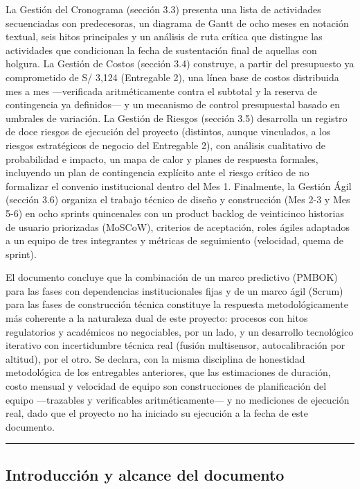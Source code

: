 \documentclass[11pt,a4paper]{article}
\begin{document}
La Gestión del Cronograma (sección 3.3) presenta una lista de actividades secuenciadas con predecesoras, un diagrama de Gantt de ocho meses en notación textual, seis hitos principales y un análisis de ruta crítica que distingue las actividades que condicionan la fecha de sustentación final de aquellas con holgura. La Gestión de Costos (sección 3.4) construye, a partir del presupuesto ya comprometido de S/ 3,124 (Entregable 2), una línea base de costos distribuida mes a mes ---verificada aritméticamente contra el subtotal y la reserva de contingencia ya definidos--- y un mecanismo de control presupuestal basado en umbrales de variación. La Gestión de Riesgos (sección 3.5) desarrolla un registro de doce riesgos de ejecución del proyecto (distintos, aunque vinculados, a los riesgos estratégicos de negocio del Entregable 2), con análisis cualitativo de probabilidad e impacto, un mapa de calor y planes de respuesta formales, incluyendo un plan de contingencia explícito ante el riesgo crítico de no formalizar el convenio institucional dentro del Mes 1. Finalmente, la Gestión Ágil (sección 3.6) organiza el trabajo técnico de diseño y construcción (Mes 2-3 y Mes 5-6) en ocho sprints quincenales con un product backlog de veinticinco historias de usuario priorizadas (MoSCoW), criterios de aceptación, roles ágiles adaptados a un equipo de tres integrantes y métricas de seguimiento (velocidad, quema de sprint).

El documento concluye que la combinación de un marco predictivo (PMBOK) para las fases con dependencias institucionales fijas y de un marco ágil (Scrum) para las fases de construcción técnica constituye la respuesta metodológicamente más coherente a la naturaleza dual de este proyecto: procesos con hitos regulatorios y académicos no negociables, por un lado, y un desarrollo tecnológico iterativo con incertidumbre técnica real (fusión multisensor, autocalibración por altitud), por el otro. Se declara, con la misma disciplina de honestidad metodológica de los entregables anteriores, que las estimaciones de duración, costo mensual y velocidad de equipo son construcciones de planificación del equipo ---trazables y verificables aritméticamente--- y no mediciones de ejecución real, dado que el proyecto no ha iniciado su ejecución a la fecha de este documento.

\begin{center}\rule{0.5\linewidth}{0.5pt}\end{center}

\subsection{Introducción y alcance del documento}\label{introducciuxf3n-y-alcance-del-documento}
\end{document}
